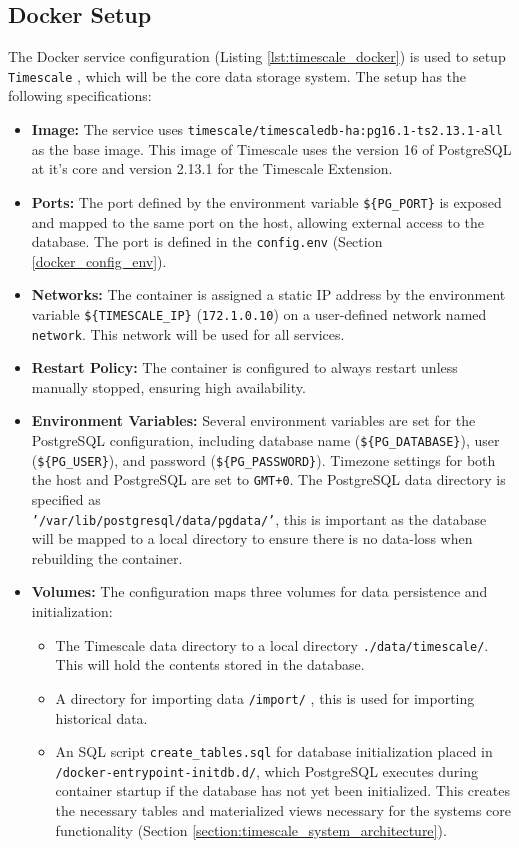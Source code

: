 \subsection{Docker Setup}
The Docker service configuration (Listing \ref{lst:timescale_docker}) is used to setup \texttt{Timescale} \cite{Timescale}, which will be the core data storage system. The setup has the following specifications:

\begin{itemize}
  \item \textbf{Image:} The service uses \texttt{timescale/timescaledb-ha:pg16.1-ts2.13.1-all} as the base image. This image of Timescale uses the version 16 of PostgreSQL at it's core and version 2.13.1 for the Timescale Extension. 
  \item \textbf{Ports:} The port defined by the environment variable \texttt{\$\{PG\_PORT\}} is exposed and mapped to the same port on the host, allowing external access to the database. The port is defined in the \texttt{config.env} (Section \ref{docker_config_env}).
  \item \textbf{Networks:} The container is assigned a static IP address by the environment variable \texttt{\$\{TIMESCALE\_IP\}} (\texttt{172.1.0.10}) on a user-defined network named \texttt{network}. This network will be used for all services.
  \item \textbf{Restart Policy:} The container is configured to always restart unless manually stopped, ensuring high availability.
  \item \textbf{Environment Variables:} Several environment variables are set for the PostgreSQL configuration, including database name (\texttt{\$\{PG\_DATABASE\}}), user (\texttt{\$\{PG\_USER\}}), and password (\texttt{\$\{PG\_PASSWORD\}}). Timezone settings for both the host and PostgreSQL are set to \texttt{GMT+0}. The PostgreSQL data directory is specified as \\ \texttt{'/var/lib/postgresql/data/pgdata/'}, this is important as the database will be mapped to a local directory to ensure there is no data-loss when rebuilding the container.
  \item \textbf{Volumes:} The configuration maps three volumes for data persistence and initialization:
    \begin{itemize}
      \item The Timescale data directory to a local directory \texttt{./data/timescale/}. This will hold the contents stored in the database.
      \item A directory for importing data \texttt{/import/} , this is used for importing historical data.
      \item An SQL script \texttt{create\_tables.sql} for database initialization placed in \\
      \texttt{/docker-entrypoint-initdb.d/}, which PostgreSQL executes during container startup if the database has not yet been initialized. This creates the necessary tables and materialized views necessary for the systems core functionality (Section \ref{section:timescale_system_architecture}).
    \end{itemize}
\end{itemize}

